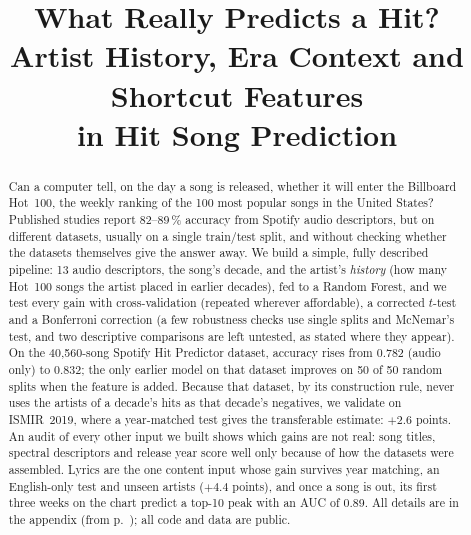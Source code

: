 \documentclass[conference]{IEEEtran}
\begin{document}
\title{What Really Predicts a Hit?\\ Artist History, Era Context and Shortcut Features\\ in Hit Song Prediction}

\author{
}

\maketitle

\begin{abstract}
Can a computer tell, on the day a song is released, whether it will enter the Billboard Hot~100, the weekly
ranking of the 100 most popular songs in the United States? Published
studies report 82--89\,\% accuracy from Spotify audio descriptors, but on different datasets, usually on a single
train/test split, and without checking whether the datasets themselves give the answer away. We build a simple,
fully described pipeline: 13 audio descriptors, the song's decade, and the artist's \emph{history} (how many Hot~100
songs the artist placed in earlier decades), fed to a Random Forest, and we test every gain with
cross-validation (repeated wherever affordable), a corrected $t$-test and a Bonferroni correction (a few
robustness checks use single splits and McNemar's test, and two descriptive comparisons are left untested, as
stated where they appear). On the 40{,}560-song Spotify Hit Predictor
dataset, accuracy rises from 0.782 (audio only) to 0.832; the only earlier model on that dataset improves on 50 of 50
random splits when the feature is added. Because that dataset, by its construction rule, never uses the artists of
a decade's hits as that decade's negatives, we
validate on ISMIR~2019, where a year-matched test gives the transferable estimate: $+2.6$ points. An audit of every
other input we built shows which gains are not real: song titles, spectral descriptors and release year score
well only because of how the datasets were assembled. Lyrics are the one content input whose gain survives
year matching, an English-only test and unseen artists ($+4.4$ points), and once a song is out, its first three weeks on the chart predict a top-10 peak with an
AUC of 0.89. All details are in the appendix (from p.~\pageref{appstart}); all code and data are public.
\end{abstract}
\end{document}
